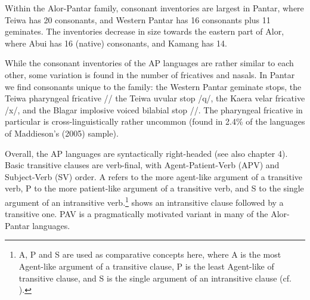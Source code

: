 Within the Alor-Pantar family, consonant inventories are largest in Pantar, where Teiwa has 20 consonants, and Western Pantar has 16 consonants plus 11 geminates. The inventories decrease in size towards the eastern part of Alor, where Abui has 16 (native) consonants, and Kamang has 14. 

While the consonant inventories of the AP languages are rather similar to each other, some variation is found in the number of fricatives and nasals. In Pantar we find consonants unique to the family: the Western Pantar geminate stops, the Teiwa pharyngeal fricative /{\pharfric}/ the Teiwa uvular stop /q/, the Kaera velar fricative /x/, and the Blagar implosive voiced bilabial stop /{\texthtb}/. The pharyngeal fricative in particular is cross-linguistically rather uncommon (found in 2.4\% of  the languages of Maddieson's (2005) sample). \nocite{Maddieson2005}

Overall, the AP languages are syntactically right-headed (see also chapter 4). Basic transitive clauses are verb-final, with Agent-Patient-Verb (APV) and Subject-Verb (SV) order. A refers to the more agent-like argument of a transitive verb, P to the more patient-like argument of a transitive verb, and S to the single argument of an intransitive verb.\footnote{A, P and S are used as comparative concepts here, where A is the most Agent-like argument of a transitive clause, P is the least Agent-like of transitive clause, and S is the single argument of an intransitive clause (cf. \citealt{Comrie1989,Haspelmath2011}).}   shows an intransitive clause followed by a transitive one. PAV is a pragmatically motivated variant in many of the Alor-Pantar languages.


